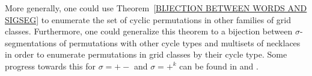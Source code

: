 \documentclass[12pt]{article}
\theoremstyle{plain}
\theoremstyle{definition}
\begin{document}
More generally, one could use Theorem~\ref{BIJECTION BETWEEN WORDS AND SIGSEG} to enumerate the set of cyclic permutations in other families of grid classes. Furthermore, one could generalize this theorem to a bijection between $\sigma$-segmentations of permutations with other cycle types and multisets of necklaces in order to enumerate permutations in grid classes by their cycle type. Some progress towards this for $\sigma = +-$ and $\sigma = +^k$ can be found in \cite{Thibon} and \cite{gessel}.  







\end{document}
